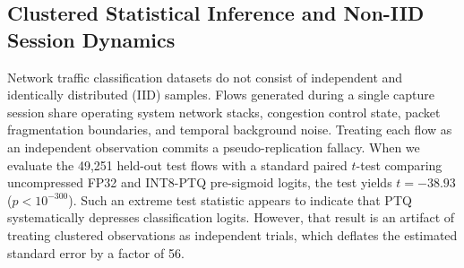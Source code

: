 \documentclass[conference]{IEEEtran}
\begin{document}
\subsection{Clustered Statistical Inference and Non-IID Session Dynamics}

Network traffic classification datasets do not consist of independent and identically distributed (IID) samples. Flows generated during a single capture session share operating system network stacks, congestion control state, packet fragmentation boundaries, and temporal background noise. Treating each flow as an independent observation commits a pseudo-replication fallacy. When we evaluate the 49,251 held-out test flows with a standard paired $t$-test comparing uncompressed FP32 and INT8-PTQ pre-sigmoid logits, the test yields $t = -38.93$ ($p < 10^{-300}$). Such an extreme test statistic appears to indicate that PTQ systematically depresses classification logits. However, that result is an artifact of treating clustered observations as independent trials, which deflates the estimated standard error by a factor of 56.

\begin{table}[htbp]
\caption{Canonical Test Session Breakdown and Logit Shifts ($K=16$)}
\label{tab:session_shifts}
\centering
{}
\end{table}
\end{document}
